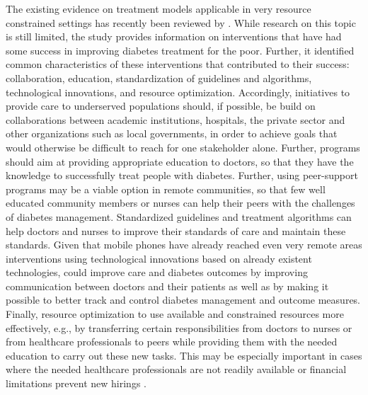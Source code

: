 The existing evidence on treatment models applicable in very resource constrained settings  has recently been reviewed by \textcite{Esterson2014}. While research on this topic is still limited, the study provides information on interventions that have had some success in improving diabetes treatment for the poor. Further, it identified common characteristics of these interventions that contributed to their success: collaboration, education, standardization of guidelines and algorithms, technological innovations, and resource optimization. Accordingly, initiatives to provide care to underserved populations should, if possible, be build on collaborations between academic institutions, hospitals, the private sector and other organizations such as local governments, in order to achieve goals that would otherwise be difficult to reach for one stakeholder alone. Further, programs should aim at providing appropriate education to doctors, so that they have the knowledge to successfully treat people with diabetes. Further, using peer-support programs may be a viable option in remote communities, so that few well educated community members or nurses can help their peers with the challenges of diabetes management. Standardized guidelines and treatment algorithms can help doctors and nurses to improve their standards of care and maintain these standards. Given that mobile phones have already reached even very remote areas interventions using technological innovations based on already existent technologies, could improve care and diabetes outcomes by improving communication between doctors and their patients as well as by making it possible to better track and control diabetes management and outcome measures. Finally, resource optimization to use available and constrained resources more effectively, e.g., by transferring certain responsibilities from doctors to nurses or from healthcare professionals to peers while providing them with the needed education to carry out these new tasks. This may be especially important in cases where the needed healthcare professionals are not readily available or financial limitations prevent new hirings \parencite{Esterson2014}.

